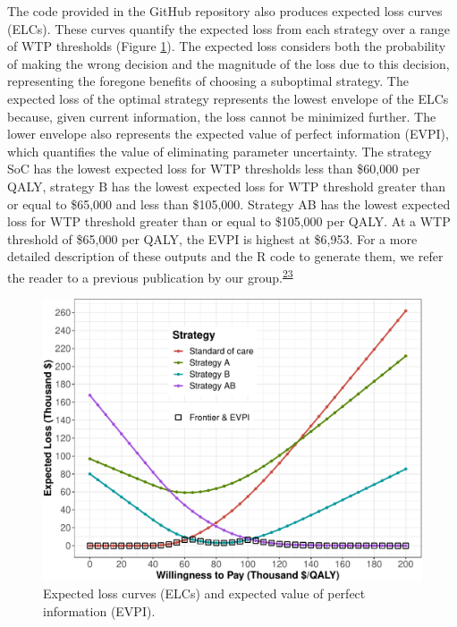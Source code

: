 \documentclass[
]{article}
\begin{document}
The code provided in the GitHub repository also produces expected loss curves (ELCs). These curves quantify the expected loss from each strategy over a range of WTP thresholds (Figure \ref{fig:ELC-AgeDep}). The expected loss considers both the probability of making the wrong decision and the magnitude of the loss due to this decision, representing the foregone benefits of choosing a suboptimal strategy. The expected loss of the optimal strategy represents the lowest envelope of the ELCs because, given current information, the loss cannot be minimized further. The lower envelope also represents the expected value of perfect information (EVPI), which quantifies the value of eliminating parameter uncertainty. The strategy SoC has the lowest expected loss for WTP thresholds less than \$60,000 per QALY, strategy B has the lowest expected loss for WTP threshold greater than or equal to \$65,000 and less than \$105,000. Strategy AB has the lowest expected loss for WTP threshold greater than or equal to \$105,000 per QALY. At a WTP threshold of \$65,000 per QALY, the EVPI is highest at \$6,953. For a more detailed description of these outputs and the R code to generate them, we refer the reader to a previous publication by our group.\textsuperscript{\protect\hyperlink{ref-Alarid-Escudero2019}{23}}

\begin{figure}[H]

{\centering \includegraphics{../figs/ELC-AgeDep-1} 

}

\caption{Expected loss curves (ELCs) and expected value of perfect information (EVPI).}\label{fig:ELC-AgeDep}
\end{figure}
\end{document}
